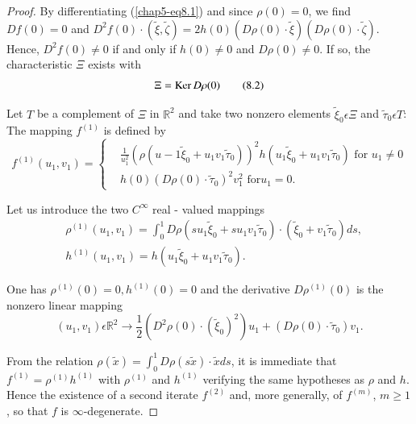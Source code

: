 \begin{proof}
By differentiating (\ref{chap5-eq8.1}) and since $\rho(0) = 0$, we
find $Df(0) = 0$ and $D^{2}f(0) \cdot (\widetilde{\xi},
\widetilde{\zeta}) = 2h(0)(D\rho(0) \cdot \widetilde{\xi})(D\rho(0)
\cdot\widetilde{\zeta})$. Hence, $D^{2}f(0) \neq 0$ if and only if
$h(0) \neq 0$ and $D\rho(0) \neq 0$. If so, the characteristic $\Xi$
exists with
\begin{equation*}
\Xi = \operatorname{Ker} D\rho(0)\tag{8.2}\label{chap5-eq8.2}
\end{equation*}

Let $T$ be a complement of $\Xi$ in $\mathbb{R}^{2}$ and take two
nonzero elements $\widetilde{\xi}_{0} \epsilon \Xi$ and
$\widetilde{\tau}_{0} \epsilon T$: The mapping $f^{(1)}$ is defined by
\begin{equation*}
f^{(1)}(u_{1}, v_{1}) = 
\begin{cases}
& \frac{1}{u_{1}^{2}} (\rho(u-{1} \widetilde{\xi}_{0} + u_{1}v_{1}
\widetilde{\tau}_{0}))^{2} h(u_{1} \widetilde{\xi}_{0} + u_{1}v_{1}
\widetilde{\tau}_{0}) \text{ for } u_{1} \neq 0\\
& h(0) (D\rho(0) \cdot \widetilde{\tau}_{0})^{2} v_{1}^{2} \text{ for
} u_{1} = 0.
\end{cases}
\end{equation*}

Let us introduce the two $C^{\infty}$ real - valued mappings
\begin{align*}
& \rho^{(1)} (u_{1}, v_{1}) = \int_{0}^{1} D\rho(su_{1}
  \widetilde{\xi}_{0} + su_{1} v_{1} \widetilde{\tau}_{0}) \cdot
  (\widetilde{\xi}_{0} + v_{1} \widetilde{\tau}_{0}) ds,\\
& h^{(1)} (u_{1}, v_{1}) = h(u_{1} \widetilde{\xi}_{0} + u_{1}v_{1}
  \widetilde{\tau}_{0}). 
\end{align*}

One has $\rho^{(1)} (0) = 0, h^{(1)}(0) = 0$ and the derivative
$D\rho^{(1)} (0)$ is the nonzero linear mapping
$$
(u_{1}, v_{1}) \epsilon \mathbb{R}^{2} \to \frac{1}{2}(D^{2} \rho(0)
\cdot (\widetilde{\xi}_{0})^{2}) u_{1} + (D\rho(0) \cdot
\widetilde{\tau}_{0}) v_{1}.
$$

From the relation $\rho(\widetilde{x}) = \int_{0}^{1} D\rho(s
\widetilde{x}) \cdot \widetilde{x} ds$, it is immediate that $f^{(1)}
= \rho^{(1)} h^{(1)}$ with $\rho^{(1)}$ and $h^{(1)}$ verifying the
same hypotheses as $\rho$ and $h$. Hence the existence of a second
iterate $f^{(2)}$ and, more generally, of $f^{(m)}$, $m \geq 1$, so
that $f$ is $\infty$-degenerate.
\end{proof}

